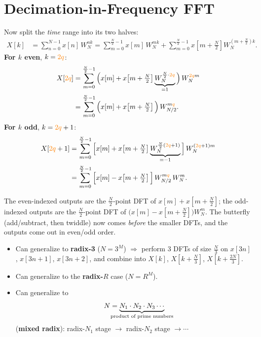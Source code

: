 \documentclass[handout_subfiles_root.tex]{subfiles}
\newcommand{\HandoutTwoQ}{\textcolor{orange}{2q}}
\newcommand{\HandoutQ}{\textcolor{orange}{q}}
\begin{document}
\section{Decimation-in-Frequency FFT}

Now split the \emph{time} range into its two halves:
\begin{align*}
X[k] &= \sum_{n=0}^{N-1} x[n]\,W_N^{nk}
= \sum_{m=0}^{\frac{N}{2}-1} x[m]\,W_N^{mk} + \sum_{m=0}^{\frac{N}{2}-1} x\!\left[m+\tfrac{N}{2}\right] W_N^{\left(m+\frac{N}{2}\right)k}.
\end{align*}
\textbf{For $k$ even}, $k=\HandoutTwoQ$:
\begin{align*}
X[\HandoutTwoQ] &= \sum_{m=0}^{\frac{N}{2}-1}\Big(x[m] + x\!\left[m+\tfrac{N}{2}\right]\underbrace{W_N^{\frac{N}{2}\cdot \HandoutTwoQ}}_{\HandoutUnderbraceLabel{=1}}\Big)\,W_N^{\HandoutTwoQ m} \\
&= \sum_{m=0}^{\frac{N}{2}-1}\Big(x[m] + x\!\left[m+\tfrac{N}{2}\right]\Big)\,W_{N/2}^{m\HandoutQ}.
\end{align*}
\textbf{For $k$ odd}, $k=\HandoutTwoQ+1$:
\begin{align*}
X[\HandoutTwoQ+1] &= \sum_{m=0}^{\frac{N}{2}-1}\Big[x[m] + x\!\left[m+\tfrac{N}{2}\right]\underbrace{W_N^{\frac{N}{2}(\HandoutTwoQ+1)}}_{\HandoutUnderbraceLabel{=-1}}\Big]\,W_N^{(\HandoutTwoQ+1)m} \\
&= \sum_{m=0}^{\frac{N}{2}-1}\Big[x[m] - x\!\left[m+\tfrac{N}{2}\right]\Big]\,W_{N/2}^{m\HandoutQ}\,W_N^{m}.
\end{align*}

\begin{factbox}[title={DIF in words}]
The even-indexed outputs are the $\tfrac{N}{2}$-point DFT of $x[m]+x[m+\tfrac{N}{2}]$; the odd-indexed outputs are the $\tfrac{N}{2}$-point DFT of $\big(x[m]-x[m+\tfrac{N}{2}]\big)W_N^{m}$. The butterfly (add/subtract, then twiddle) now comes \emph{before} the smaller DFTs, and the outputs come out in even/odd order.
\end{factbox}


\begin{itemize}
  \item Can generalize to \textbf{radix-3} ($N=3^M$) $\Rightarrow$ perform 3 DFTs of size $\tfrac{N}{3}$ on
  $x[3n]$, $x[3n+1]$, $x[3n+2]$, and combine into $X[k]$, $X[k+\tfrac{N}{3}]$, $X[k+\tfrac{2N}{3}]$.
  \item Can generalize to the \textbf{radix-$R$} case ($N=R^M$).
  \item Can generalize to
  \begin{equation*}
  N = \underbrace{N_1\cdot N_2\cdot N_3\cdots}_{\HandoutUnderbraceLabel{\text{product of prime numbers}}}
  \end{equation*}
  \vspace{0.2em}
  (\textbf{mixed radix}): radix-$N_1$ stage $\to$ radix-$N_2$ stage $\to\cdots$
\end{itemize}
\end{document}
